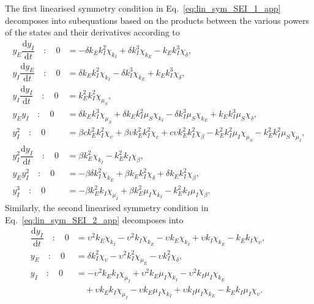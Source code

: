 \documentclass[12pt]{article}
\begin{document}
The first linearised symmetry condition in Eq.~\eqref{eq:lin_sym_SEI_1_app} decomposes into subequations based on the products between the various powers of the states and their derivatives according to
\begin{align}
y_{E} \dfrac{\mathrm{d}y_{I}}{\mathrm{d}t}\quad:\quad{0}&=- \delta k_{E} k_{I}^{2} \chi_{k_{I}} + \delta k_{I}^{3} \chi_{k_{E}} - k_{E} k_{I}^{3} \chi_{\delta},\label{eq:det_eq_1}\\
y_{I} \dfrac{\mathrm{d}y_{E}}{\mathrm{d}t}\quad:\quad{0}&=\delta k_{E} k_{I}^{2} \chi_{k_{I}} - \delta k_{I}^{3} \chi_{k_{E}} + k_{E} k_{I}^{3} \chi_{\delta},\label{eq:det_eq_2}\\
y_{I} \dfrac{\mathrm{d}y_{I}}{\mathrm{d}t}\quad:\quad{0}&=k_{E}^{2} k_{I}^{2} \chi_{\mu_{S}},\label{eq:det_eq_3}\\
y_{E} y_{I}\quad:\quad{0}&=\delta k_{E} k_{I}^{3} \chi_{\mu_{S}} + \delta k_{E} k_{I}^{2} \mu_{S} \chi_{k_{I}} - \delta k_{I}^{3} \mu_{S} \chi_{k_{E}} + k_{E} k_{I}^{3} \mu_{S} \chi_{\delta},\label{eq:det_eq_4}\\
y_{I}^{2}\quad:\quad{0}&=\beta c k_{E}^{2} k_{I}^{2} \chi_{\upsilon} + \beta \upsilon k_{E}^{2} k_{I}^{2} \chi_{c} + c \upsilon k_{E}^{2} k_{I}^{2} \chi_{\beta} - k_{E}^{2} k_{I}^{2} \mu_{I} \chi_{\mu_{S}} - k_{E}^{2} k_{I}^{2} \mu_{S} \chi_{\mu_{I}},\label{eq:det_eq_5}\\
y_{I}^{2} \dfrac{\mathrm{d}y_{I}}{\mathrm{d}t}\quad:\quad{0}&=\beta k_{E}^{2} \chi_{k_{I}} - k_{E}^{2} k_{I} \chi_{\beta},\label{eq:det_eq_6}\\
y_{E} y_{I}^{2}\quad:\quad{0}&=- \beta \delta k_{I}^{2} \chi_{k_{E}} + \beta k_{E} k_{I}^{2} \chi_{\delta} + \delta k_{E} k_{I}^{2} \chi_{\beta},\label{eq:det_eq_7}\\
y_{I}^{3}\quad:\quad{0}&=- \beta k_{E}^{2} k_{I} \chi_{\mu_{I}} + \beta k_{E}^{2} \mu_{I} \chi_{k_{I}} - k_{E}^{2} k_{I} \mu_{I} \chi_{\beta}.\label{eq:det_eq_8}
\end{align}
Similarly, the second linearised symmetry condition in Eq.~\eqref{eq:lin_sym_SEI_2_app} decomposes into
\begin{align}
\dfrac{\mathrm{d}y_{I}}{\mathrm{d}t}\quad:\quad{0}&=\upsilon^{2} k_{E} \chi_{k_{I}} - \upsilon^{2} k_{I} \chi_{k_{E}} - \upsilon k_{E} \chi_{k_{I}} + \upsilon k_{I} \chi_{k_{E}} - k_{E} k_{I} \chi_{\upsilon},\quad\quad\;\;\label{eq:det_eq_9}\\
y_{E}\quad:\quad{0}&=\delta k_{I}^{2} \chi_{\upsilon} - \upsilon^{2} k_{I}^{2} \chi_{\mu_{E}} - \upsilon k_{I}^{2} \chi_{\delta},\label{eq:det_eq_10}\\
y_{I}\quad:\quad{0}&=- \upsilon^{2} k_{E} k_{I} \chi_{\mu_{I}} + \upsilon^{2} k_{E} \mu_{I} \chi_{k_{I}} - \upsilon^{2} k_{I} \mu_{I} \chi_{k_{E}}\nonumber\\
&\quad+ \upsilon k_{E} k_{I} \chi_{\mu_{I}} - \upsilon k_{E} \mu_{I} \chi_{k_{I}} + \upsilon k_{I} \mu_{I} \chi_{k_{E}} - k_{E} k_{I} \mu_{I} \chi_{\upsilon}.\label{eq:det_eq_11}
\end{align}
\end{document}
